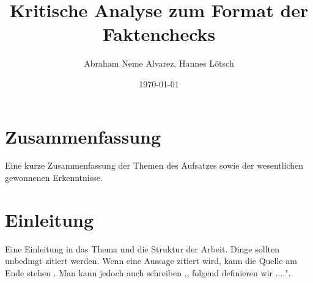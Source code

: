 \documentclass[a4paper,listof=totoc,bibliography=totoc]{scrartcl}
\title{Kritische Analyse zum Format der Faktenchecks}
\author{Abraham Neme Alvarez, Hannes Lötsch}
\date{\today}
\begin{document}
\maketitle

\section{Zusammenfassung}

Eine kurze Zusammenfassung der Themen des Aufsatzes sowie der wesentlichen
gewonnenen Erkenntnisse.

\section{Einleitung}

Eine Einleitung in das Thema und die Struktur der Arbeit. Dinge sollten
unbedingt zitiert werden. Wenn eine Aussage zitiert wird, kann die Quelle
am Ende stehen \cite{popper:2005}. Man kann jedoch auch schreiben
,,\citet{feyerabend:1986} folgend definieren wir ....".

{}

\end{document}
